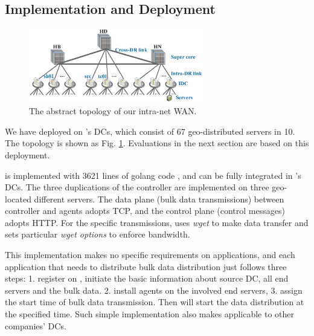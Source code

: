 \subsection{Implementation and Deployment}
\label{sec:deployment}

\begin{figure}[t]
  \centering
  \includegraphics[width=3in]{images/Testbed_v2.eps}
  \caption{The abstract topology of our intra-net WAN.}
  \label{fig:topology}
\end{figure}

We have deployed \name on \company's DCs, which consist of 67 geo-distributed servers in 10. The topology is shown as Fig. \ref{fig:topology}. Evaluations in the next section are based on this deployment.

\name is implemented with 3621 lines of golang code \cite{golang}, and can be fully integrated in \company's DCs. The three duplications of the controller are implemented on three geo-located different servers. The data plane (bulk data transmissions) between controller and agents adopts TCP, and the control plane (control messages) adopts HTTP. For the specific transmissions, \name uses \emph{wget} to make data transfer and sets particular \emph{wget options} to enforce bandwidth.

This implementation makes no specific requirements on applications, and each application that needs to distribute bulk data distribution just follows three steps: 1. register on \name, initiate the basic information about source DC, all end servers and the bulk data. 2. install agents on the involved end servers, 3. assign the start time of bulk data transmission. Then \name will start the data distribution at the specified time. Such simple implementation also makes \name applicable to other companies' DCs. 	



